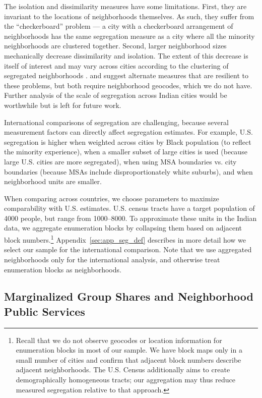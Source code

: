 \documentclass[12pt]{article}
\begin{document}
The isolation and dissimilarity measures have some limitations. First, they are invariant to the locations of neighborhoods themselves. As such, they suffer from the ``checkerboard'' problem --- a city with a checkerboard arrangement of neighborhoods has the same segregation measure as a city where all the minority neighborhoods are clustered together. Second, larger neighborhood sizes mechanically decrease dissimilarity and isolation. The extent of this decrease is itself of interest and may vary across cities according to the clustering of segregated neighborhoods \citep{reardon2008,lee2008beyond}. \citet{harari2024} and \citet{reardon2008} suggest alternate measures that are resilient to these problems, but both require neighborhood geocodes, which we do not have. Further analysis of the scale of segregation across Indian cities would be worthwhile but is left for future work.

International comparisons of segregation are challenging, because several measurement factors can directly affect segregation estimates. For example, U.S. segregation is higher when weighted across cities by Black population (to reflect the minority experience), when a smaller subset of large cities is used (because large U.S. cities are more segregated), when using MSA boundaries vs. city boundaries (because MSAs include disproportionately white suburbs), and when neighborhood units are smaller.

When comparing across countries, we choose parameters to maximize comparability with U.S. estimates. U.S. census tracts have a target population of 4000 people, but range from 1000--8000. To approximate these units in the Indian data, we aggregate enumeration blocks by collapsing them based on adjacent block numbers.\footnote{Recall that we do not observe geocodes or location information for enumeration blocks in most of our sample. We have block maps only in a small number of cities and confirm that adjacent block numbers describe adjacent neighborhoods. The U.S. Census additionally aims to create demographically homogeneous tracts; our aggregation may thus reduce measured segregation relative to that approach.} Appendix~\ref{sec:app_seg_def} describes in more detail how we select our sample for the international comparison. Note that we use aggregated neighborhoods only for the international analysis, and otherwise treat enumeration blocks as neighborhoods.

\subsection{Marginalized Group Shares and Neighborhood Public Services}
\label{sec:method_pub}
\end{document}
